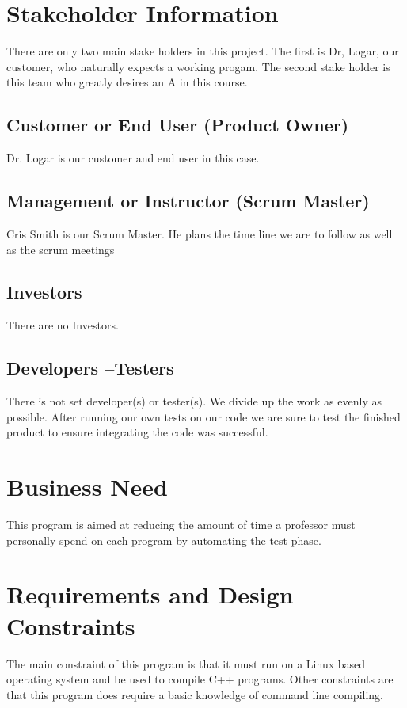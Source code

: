\section{ Stakeholder Information}


There are only two main stake holders in this project. The first is Dr, Logar, our customer, who naturally expects a working
progam. The second stake holder is this team who greatly desires an A in this course.


\subsection{Customer or End User (Product Owner)}
Dr. Logar is our customer and end user in this case.  

\subsection{Management or Instructor (Scrum Master)}
Cris Smith is our Scrum Master. He plans the time line we are to follow as well as the scrum meetings 


\subsection{Investors}
There are no Investors.


\subsection{Developers --Testers}
There is not set developer(s) or tester(s). We divide up the work as evenly as possible. After running our own tests on our 
code we are sure to test the finished product to ensure integrating the code was successful.


\section{Business Need}
This program is aimed at reducing the amount of time a professor must personally spend on each program by automating
the test phase.

\section{Requirements and Design Constraints}
The main constraint of this program is that it must run on a Linux based operating system and be used to compile C++
programs. Other constraints are that this program does require a basic knowledge of command line compiling.



